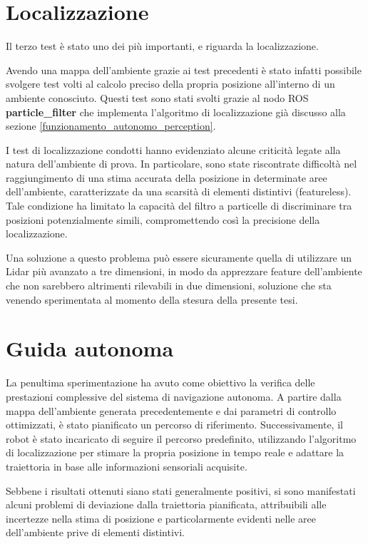 \section{Localizzazione}
Il terzo test è stato uno dei più importanti, e riguarda la localizzazione.

\noindent Avendo una mappa dell'ambiente grazie ai test precedenti è stato infatti possibile svolgere test volti al calcolo preciso della propria posizione all'interno di un ambiente conosciuto. Questi test sono stati svolti grazie al nodo ROS \textbf{particle\_filter} che implementa l'algoritmo di localizzazione già discusso alla sezione \ref{funzionamento_autonomo_perception}.

\noindent I test di localizzazione condotti hanno evidenziato alcune criticità legate alla natura dell'ambiente di prova. In particolare, sono state riscontrate difficoltà nel raggiungimento di una stima accurata della posizione in determinate aree dell'ambiente, caratterizzate da una scarsità di elementi distintivi (featureless). Tale condizione ha limitato la capacità del filtro a particelle di discriminare tra posizioni potenzialmente simili, compromettendo così la precisione della localizzazione.

\noindent Una soluzione a questo problema può essere sicuramente quella di utilizzare un Lidar più avanzato a tre dimensioni, in modo da apprezzare feature dell'ambiente che non sarebbero altrimenti rilevabili in due dimensioni, soluzione che sta venendo sperimentata al momento della stesura della presente tesi.

\section{Guida autonoma}
La penultima sperimentazione ha avuto come obiettivo la verifica delle prestazioni complessive del sistema di navigazione autonoma. A partire dalla mappa dell'ambiente generata precedentemente e dai parametri di controllo ottimizzati, è stato pianificato un percorso di riferimento. Successivamente, il robot è stato incaricato di seguire il percorso predefinito, utilizzando l'algoritmo di localizzazione per stimare la propria posizione in tempo reale e adattare la traiettoria in base alle informazioni sensoriali acquisite.

\noindent Sebbene i risultati ottenuti siano stati generalmente positivi, si sono manifestati alcuni problemi di deviazione dalla traiettoria pianificata, attribuibili alle incertezze nella stima di posizione e particolarmente evidenti nelle aree dell'ambiente prive di elementi distintivi.

